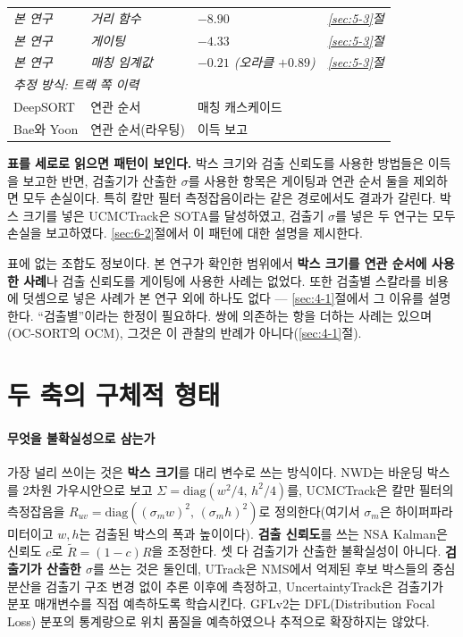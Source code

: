 \documentclass[12pt,a4paper,oneside]{report}
\begin{document}
\begin{table}[htbp]
\begin{tabular}{llll}
\textit{본 연구} & \textit{거리 함수} & \textit{$-8.90$} & \textit{\ref{sec:5-3}절} \\
\textit{본 연구} & \textit{게이팅} & \textit{$-4.33$} & \textit{\ref{sec:5-3}절} \\
\textit{본 연구} & \textit{매칭 임계값} & \textit{$-0.21$ (오라클 $+0.89$)} & \textit{\ref{sec:5-3}절} \\
\midrule
\multicolumn{4}{l}{\textit{추정 방식: 트랙 쪽 이력}} \\
DeepSORT & 연관 순서 & 매칭 캐스케이드 & \citep{wojke2017} \\
Bae와 Yoon & 연관 순서(라우팅) & 이득 보고 & \citep{bae2014} \\
\bottomrule
\end{tabular}
\end{table}

\textbf{표를 세로로 읽으면 패턴이 보인다.} 박스 크기와 검출 신뢰도를 사용한 방법들은 이득을 보고한 반면, 검출기가 산출한 $\sigma$를 사용한 항목은 게이팅과 연관 순서 둘을 제외하면 모두 손실이다. 특히 칼만 필터 측정잡음이라는 같은 경로에서도 결과가 갈린다. 박스 크기를 넣은 UCMCTrack은 SOTA를 달성하였고, 검출기 $\sigma$를 넣은 두 연구는 모두 손실을 보고하였다. \ref{sec:6-2}절에서 이 패턴에 대한 설명을 제시한다.

표에 없는 조합도 정보이다. 본 연구가 확인한 범위에서 \textbf{박스 크기를 연관 순서에 사용한 사례}나 검출 신뢰도를 게이팅에 사용한 사례는 없었다. 또한 검출별 스칼라를 비용에 덧셈으로 넣은 사례가 본 연구 외에 하나도 없다 --- \ref{sec:4-1}절에서 그 이유를 설명한다. ``검출별''이라는 한정이 필요하다. 쌍에 의존하는 항을 더하는 사례는 있으며(OC-SORT의 OCM), 그것은 이 관찰의 반례가 아니다(\ref{sec:4-1}절).

\section{두 축의 구체적 형태}\label{sec:2-2}

\paragraph{무엇을 불확실성으로 삼는가} 가장 널리 쓰이는 것은 \textbf{박스 크기}를 대리 변수로 쓰는 방식이다. NWD\citep{wang2021}는 바운딩 박스를 2차원 가우시안으로 보고 $\Sigma = \mathrm{diag}(w^2/4,\, h^2/4)$를, UCMCTrack\citep{yi2024}은 칼만 필터의 측정잡음을 $R_{uv} = \mathrm{diag}((\sigma_m w)^2,\, (\sigma_m h)^2)$로 정의한다(여기서 $\sigma_m$은 하이퍼파라미터이고 $w, h$는 검출된 박스의 폭과 높이이다). \textbf{검출 신뢰도}를 쓰는 NSA Kalman\citep{du2023}은 신뢰도 $c$로 $\tilde{R} = (1-c) R$을 조정한다. 셋 다 검출기가 산출한 불확실성이 아니다. \textbf{검출기가 산출한 $\sigma$}를 쓰는 것은 둘인데, UTrack\citep{solano2024}은 NMS에서 억제된 후보 박스들의 중심 분산을 검출기 구조 변경 없이 추론 이후에 측정하고, UncertaintyTrack\citep{lee2024}은 검출기가 분포 매개변수를 직접 예측하도록 학습시킨다. GFLv2\citep{li2021}는 DFL(Distribution Focal Loss) 분포의 통계량으로 위치 품질을 예측하였으나 추적으로 확장하지는 않았다.
\end{document}
